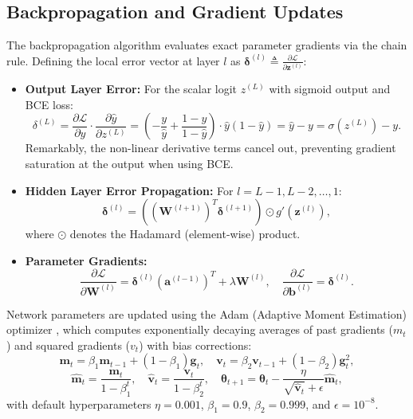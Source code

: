 \documentclass[11pt,a4paper]{article}
\begin{document}
\subsection{Backpropagation and Gradient Updates}
The backpropagation algorithm evaluates exact parameter gradients via the chain rule. Defining the local error vector at layer $l$ as $\boldsymbol{\delta}^{(l)} \triangleq \frac{\partial \mathcal{L}}{\partial \mathbf{z}^{(l)}}$:
\begin{itemize}[leftmargin=*]
    \item \textbf{Output Layer Error:} For the scalar logit $z^{(L)}$ with sigmoid output and BCE loss:
    \begin{equation}
        \delta^{(L)} = \frac{\partial \mathcal{L}}{\partial \hat{y}} \cdot \frac{\partial \hat{y}}{\partial z^{(L)}} = \left( -\frac{y}{\hat{y}} + \frac{1 - y}{1 - \hat{y}} \right) \cdot \hat{y}(1 - \hat{y}) = \hat{y} - y = \sigma(z^{(L)}) - y.
        \label{eq:output_error}
    \end{equation}
    Remarkably, the non-linear derivative terms cancel out, preventing gradient saturation at the output when using BCE.
    \item \textbf{Hidden Layer Error Propagation:} For $l = L-1, L-2, \dots, 1$:
    \begin{equation}
        \boldsymbol{\delta}^{(l)} = \left( (\mathbf{W}^{(l+1)})^T \boldsymbol{\delta}^{(l+1)} \right) \odot g'(\mathbf{z}^{(l)}),
        \label{eq:hidden_error}
    \end{equation}
    where $\odot$ denotes the Hadamard (element-wise) product.
    \item \textbf{Parameter Gradients:}
    \begin{equation}
        \frac{\partial \mathcal{L}}{\partial \mathbf{W}^{(l)}} = \boldsymbol{\delta}^{(l)} (\mathbf{a}^{(l-1)})^T + \lambda \mathbf{W}^{(l)}, \quad 
        \frac{\partial \mathcal{L}}{\partial \mathbf{b}^{(l)}} = \boldsymbol{\delta}^{(l)}.
    \end{equation}
\end{itemize}

Network parameters are updated using the Adam (Adaptive Moment Estimation) optimizer \cite{kingma2014adam}, which computes exponentially decaying averages of past gradients ($m_t$) and squared gradients ($v_t$) with bias corrections:
\begin{equation}
    \mathbf{m}_t = \beta_1 \mathbf{m}_{t-1} + (1 - \beta_1) \mathbf{g}_t, \quad 
    \mathbf{v}_t = \beta_2 \mathbf{v}_{t-1} + (1 - \beta_2) \mathbf{g}_t^2,
\end{equation}
\begin{equation}
    \hat{\mathbf{m}}_t = \frac{\mathbf{m}_t}{1 - \beta_1^t}, \quad 
    \hat{\mathbf{v}}_t = \frac{\mathbf{v}_t}{1 - \beta_2^t}, \quad 
    \boldsymbol{\theta}_{t+1} = \boldsymbol{\theta}_t - \frac{\eta}{\sqrt{\hat{\mathbf{v}}_t} + \epsilon} \hat{\mathbf{m}}_t,
\end{equation}
with default hyperparameters $\eta = 0.001$, $\beta_1 = 0.9$, $\beta_2 = 0.999$, and $\epsilon = 10^{-8}$.
\end{document}
